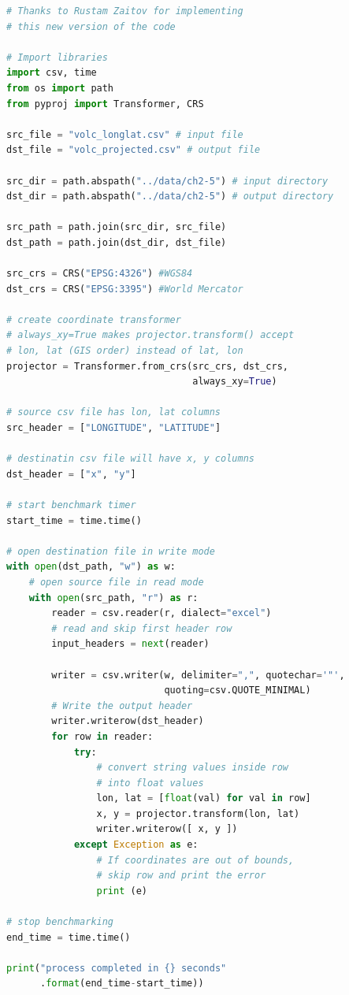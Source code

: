\documentclass[a4paper , 12pt]{book}
\begin{document}
\begin{center}
\begin{lstlisting}[language=Python, frame=single]
# Thanks to Rustam Zaitov for implementing 
# this new version of the code

# Import libraries
import csv, time
from os import path
from pyproj import Transformer, CRS

src_file = "volc_longlat.csv" # input file
dst_file = "volc_projected.csv" # output file

src_dir = path.abspath("../data/ch2-5") # input directory
dst_dir = path.abspath("../data/ch2-5") # output directory

src_path = path.join(src_dir, src_file)
dst_path = path.join(dst_dir, dst_file)

src_crs = CRS("EPSG:4326") #WGS84
dst_crs = CRS("EPSG:3395") #World Mercator

# create coordinate transformer
# always_xy=True makes projector.transform() accept 
# lon, lat (GIS order) instead of lat, lon
projector = Transformer.from_crs(src_crs, dst_crs, 
                                 always_xy=True)

# source csv file has lon, lat columns
src_header = ["LONGITUDE", "LATITUDE"]

# destinatin csv file will have x, y columns
dst_header = ["x", "y"]

# start benchmark timer
start_time = time.time()

# open destination file in write mode
with open(dst_path, "w") as w:
    # open source file in read mode
    with open(src_path, "r") as r:
        reader = csv.reader(r, dialect="excel")
        # read and skip first header row 
        input_headers = next(reader)         

        writer = csv.writer(w, delimiter=",", quotechar='"',
                            quoting=csv.QUOTE_MINIMAL)
        # Write the output header
        writer.writerow(dst_header)   
        for row in reader:
            try:
                # convert string values inside row 
                # into float values
                lon, lat = [float(val) for val in row]
                x, y = projector.transform(lon, lat)
                writer.writerow([ x, y ])
            except Exception as e:
                # If coordinates are out of bounds, 
                # skip row and print the error
                print (e)

# stop benchmarking
end_time = time.time()

print("process completed in {} seconds"
      .format(end_time-start_time))
\end{lstlisting}
\end{center}
\end{document}
